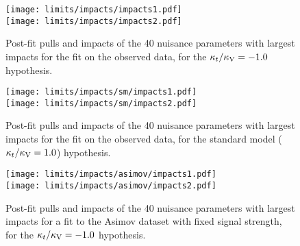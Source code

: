 \begin{figure} [!h]
 \centering
 \texttt{[image: limits/impacts/impacts1.pdf]}\\
 \texttt{[image: limits/impacts/impacts2.pdf]}\\
\caption{Post-fit pulls and impacts of the 40 nuisance parameters with largest impacts for the fit on the observed data, for the $\kappa_t/\kappa_\text{V}=-1.0$ hypothesis.}
\label{fig:impacts}
\end{figure}

\begin{figure} [!h]
 \centering
 \texttt{[image: limits/impacts/sm/impacts1.pdf]}\\
 \texttt{[image: limits/impacts/sm/impacts2.pdf]}\\
\caption{Post-fit pulls and impacts of the 40 nuisance parameters with largest impacts for the fit on the observed data, for the standard model ($\kappa_t/\kappa_\text{V}=1.0$) hypothesis.}
\label{fig:impacts_sm}
\end{figure}

\begin{figure} [!h]
 \centering
 \texttt{[image: limits/impacts/asimov/impacts1.pdf]}\\
 \texttt{[image: limits/impacts/asimov/impacts2.pdf]}\\
\caption{Post-fit pulls and impacts of the 40 nuisance parameters with largest impacts for a fit to the Asimov dataset with fixed signal strength, for the $\kappa_t/\kappa_\text{V}=-1.0$ hypothesis.}
\label{fig:impacts_asimov}
\end{figure}






